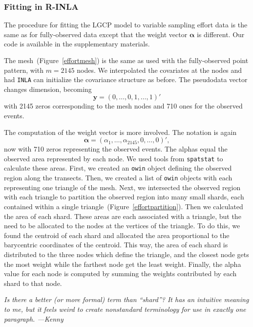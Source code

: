 \documentclass[]{interact}
\begin{document}
\subsubsection{Fitting in R-INLA}

The procedure for fitting the LGCP model to variable sampling effort data is
the same as for fully-observed data except that the weight vector
\(\boldsymbol{\alpha}\) is different. Our code is available in the
supplementary materials.

The mesh~(Figure~\ref{effortmesh}) is the same as used with the fully-observed
point pattern, with \(m = 2145\) nodes. We interpolated the covariates
at the nodes and had \texttt{INLA} can initialize the covariance structure as
before. The pseudodata vector changes dimension, becoming
\begin{displaymath}
\mathbf{y} = (0, \dots, 0, 1, \dots, 1)'
\end{displaymath}
with 2145 zeros corresponding to the mesh nodes and 710 ones for the observed
events.

The computation of the weight vector is more involved. The notation is again
\begin{displaymath}
\boldsymbol{\alpha} = (\alpha_{1}, \dots, \alpha_{2145}, 0, \dots, 0)',
\end{displaymath}
now with 710 zeros representing the observed events. The alphas equal the
observed area represented by each node. We used tools from \texttt{spatstat}
to calculate these areas. First, we created an \texttt{owin} object defining
the observed region along the transects. Then, we created a list of
\texttt{owin} objects with each representing one triangle of the mesh. Next,
we intersected the observed region with each triangle to partition the observed
region into many small shards, each contained within a single
triangle~(Figure~\ref{effortpartition}). Then we calculated the area of each
shard. These areas are each associated with a triangle, but the need to be
allocated to the nodes at the vertices of the triangle. To do this, we found
the centroid of each shard and allocated the area proportional to the
barycentric coordinates of the centroid. This way, the area of each shard is
distributed to the three nodes which define the triangle, and the closest node
gets the most weight while the farthest node get the least weight. Finally,
the alpha value for each node is computed by summing the weights contributed
by each shard to that node.

{\it Is there a better (or more formal) term than ``shard''? It has an
intuitive meaning to me, but it feels weird to create nonstandard terminology
for use in exactly one paragraph. ---Kenny}
\end{document}

